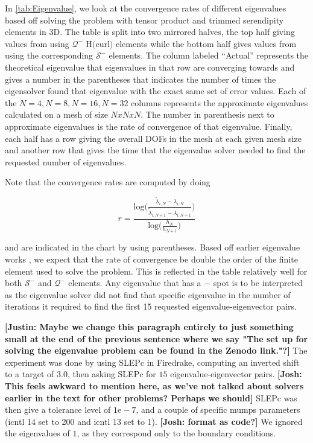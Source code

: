 \documentclass[format=acmsmall,screen,timestamp=false,a4paper]{acmart}
\newcommand\josh[1]{\textbf{\textcolor[rgb]{0,.5,1}{[Josh: #1]}}}
\newcommand\justin[1]{\textbf{\textcolor[rgb]{0,1,0.5}{[Justin: #1]}}}
\begin{document}
In \cref{tab:Eigenvalue}, we look at the convergence rates of different eigenvalues based off solving the problem with tensor product and trimmed serendipity elements in 3D.  The table is split into two mirrored halves, the top half giving values from using $\mathcal{Q}^-$ H$($curl$)$ elements while the bottom half gives values from using the corresponding $\mathcal{S}^-$ elements.  The column labeled ``Actual'' represents the theoretical eigenvalue that eigenvalues in that row are converging towards and gives a number in the parentheses that indicates the number of times the eigensolver found that eigenvalue with the exact same set of error values. Each of the $N=4, N=8, N=16, N=32$ columns represents the approximate eigenvalues calculated on a mesh of size $N x N x N$.  The number in parenthesis next to approximate eigenvalues is the rate of convergence of that eigenvalue.  Finally, each half has a row giving the overall DOFs in the mesh at each given mesh size and another row that gives the time that the eigenvalue solver needed to find the requested number of eigenvalues.


Note that the convergence rates are computed by doing

\[r = \frac{\text{log}\bigg(\frac{\tilde{\lambda}_{i,N} - \lambda_{i,N}}{\tilde{\lambda}_{i,N+1} - \lambda_{i,N+1}} \bigg)}{\text{log}\bigg( \frac{h_N}{h_{N+1}} \bigg)} \]

\noindent and are indicated in the chart by using parentheses.  Based off earlier eigenvalue works \cite{boffi2010finite}, we expect that the rate of convergence be double the order of the finite element used to solve the problem.  This is reflected in the table relatively well for both $\mathcal{S}^-$ and $\mathcal{Q}^-$ elements.  Any eigenvalue that has a $-$ spot is to be interpreted as the eigenvalue solver did not find that specific eigenvalue in the number of iterations it required to find the first 15 requested eigenvalue-eigenvector pairs.


\justin{Maybe we change this paragraph entirely to just something small at the end of the previous sentence where we say "The set up for solving the eigenvalue problem can be found in the Zenodo link."?}
The experiment was done by using SLEPc in Firedrake, computing an inverted shift to a target of $3.0$, then asking SLEPc for $15$ eigenvalue-eigenvector pairs.  \josh{This feels awkward to mention here, as we've not talked about solvers earlier in the text for other problems?  Perhaps we should}   SLEPc was then give a tolerance level of $1\text{e}-7$, and a couple of specific mumps parameters (icntl 14 set to 200 and icntl 13 set to 1).  \josh{format as code?} We ignored the eigenvalues of $1$, as they correspond only to the boundary conditions. 
\end{document}
